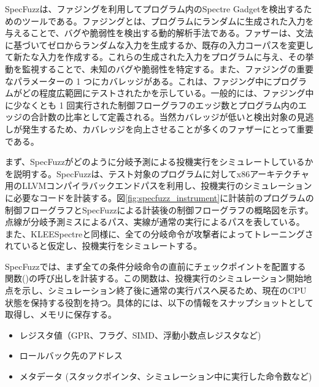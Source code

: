 SpecFuzz\cite{oleksenko2020specfuzz}は、ファジングを利用してプログラム内のSpectre Gadgetを検出するためのツールである。ファジングとは、プログラムにランダムに生成された入力を与えることで、バグや脆弱性を検出する動的解析手法である。ファザーは、文法に基づいてゼロからランダムな入力を生成するか、既存の入力コーパスを変更して新たな入力を作成する。これらの生成された入力をプログラムに与え、その挙動を監視することで、未知のバグや脆弱性を特定する。また、ファジングの重要なパラメーターの 1 つにカバレッジがある。これは、ファジング中にプログラムがどの程度広範囲にテストされたかを示している。一般的には、ファジング中に少なくとも 1 回実行された制御フローグラフのエッジ数とプログラム内のエッジの合計数の比率として定義される。当然カバレッジが低いと検出対象の見逃しが発生するため、カバレッジを向上させることが多くのファザーにとって重要である。\par
まず、SpecFuzzがどのように分岐予測による投機実行をシミュレートしているかを説明する。SpecFuzzは、テスト対象のプログラムに対してx86アーキテクチャ用のLLVMコンパイラバックエンドパスを利用し、投機実行のシミュレーションに必要なコードを計装する。図\ref{fig:specfuzz_instrument}に計装前のプログラムの制御フローグラフとSpecFuzzによる計装後の制御フローグラフの概略図を示す。点線が分岐予測ミスによるパス、実線が通常の実行によるパスを表している。
また、KLEESpectreと同様に、全ての分岐命令が攻撃者によってトレーニングされていると仮定し、投機実行をシミュレートする。\par
SpecFuzzでは、まず全ての条件分岐命令の直前にチェックポイントを配置する関数()の呼び出しを計装する。この関数は、投機実行のシミュレーション開始地点を示し、シミュレーション終了後に通常の実行パスへ戻るため、現在のCPU状態を保持する役割を持つ。具体的には、以下の情報をスナップショットとして取得し、メモリに保存する。\par

\begin{itemize}
  \item レジスタ値（GPR、フラグ、SIMD、浮動小数点レジスタなど)
  \item ロールバック先のアドレス
  \item メタデータ (スタックポインタ、シミュレーション中に実行した命令数など)
\end{itemize}

